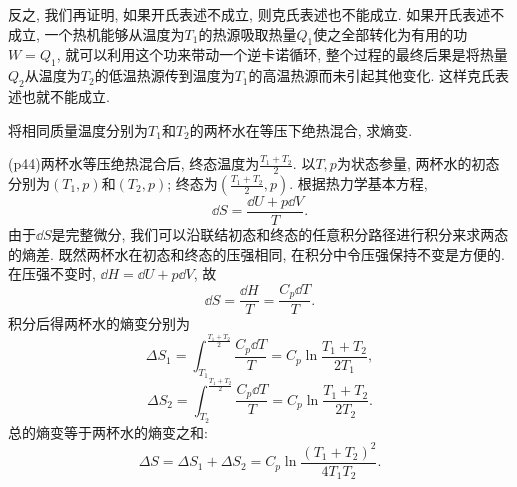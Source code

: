 \begin{questions}
\begin{solution}
    反之, 我们再证明, 如果开氏表述不成立, 则克氏表述也不能成立. 如果开氏表述不成立, 一个热机能够从温度为$T_1$的热源吸取热量$Q_1$使之全部转化为有用的功$W=Q_1$, 就可以利用这个功来带动一个逆卡诺循环, 整个过程的最终后果是将热量$Q_2$从温度为$T_2$的低温热源传到温度为$T_1$的高温热源而未引起其他变化. 这样克氏表述也就不能成立.
  \end{solution}
  \question 将相同质量温度分别为$T_1$和$T_2$的两杯水在等压下绝热混合, 求熵变.
  \begin{solution}
    (p44)两杯水等压绝热混合后, 终态温度为$\frac{T_1+T_2}{2}$. 以$T, p$为状态参量, 两杯水的初态分别为$(T_1, p)$和$(T_2, p)$; 终态为$(\frac{T_1+T_2}{2}, p)$. 根据热力学基本方程,
    \begin{equation}
      \dd S = \frac{\dd U + p\dd V}{T}.
    \end{equation}
    由于$\dd S$是完整微分, 我们可以沿联结初态和终态的任意积分路径进行积分来求两态的熵差. 既然两杯水在初态和终态的压强相同, 在积分中令压强保持不变是方便的. 在压强不变时, $\dd H = \dd U + p\dd V$, 故
    \begin{equation}
      \dd S = \frac{\dd H}{T} = \frac{C_p\dd T}{T}.
    \end{equation}
    积分后得两杯水的熵变分别为
    \begin{equation}
      \Delta S_1 = \int_{T_1}^{\frac{T_1+T_2}{2}}\frac{C_p\dd T}{T} = C_p\ln\frac{T_1+T_2}{2T_1},
    \end{equation}
    \begin{equation}
      \Delta S_2 = \int_{T_2}^{\frac{T_1+T_2}{2}}\frac{C_p\dd T}{T} = C_p\ln\frac{T_1+T_2}{2T_2}.
    \end{equation}
    总的熵变等于两杯水的熵变之和:
    \begin{equation}
      \Delta S = \Delta S_1 + \Delta S_2 = C_p\ln\frac{(T_1+T_2)^2}{4T_1T_2}.
    \end{equation}
  \end{solution}
\end{questions}

